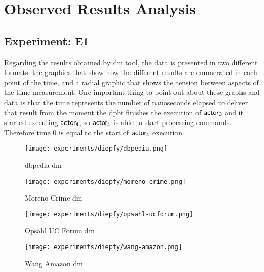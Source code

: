 \section{\textbf{Observed Results Analysis}}\label{sec:discussion}
\subsection{Experiment: E1}\label{sub:sec:res:e1}
Regarding the results obtained by \acrshort{dm} tool, the data is presented in two different formats: the graphics that show 
how the different results are enumerated in each point of the time, and a radial graphic that shows the tension between aspects of the time measurement.
One important thing to point out about these graphs and data is that the time represents the number of nanoseconds elapsed to deliver that result from the moment the \acrshort{dpbt} finishes the execution of $\mathsf{actor_3}$ and it started executing $\mathsf{actor_4}$, so $\mathsf{actor_4}$ is able to start processing commands. 
Therefore time $0$ is equal to the start of $\mathsf{actor_4}$ execution.

\begin{figure}[!htb]
  \centering
  \begin{minipage}{0.5\textwidth}
   \texttt{[image: experiments/diepfy/dbpedia.png]}
    \caption{\acrshort{dbpedia} \acrshort{dm}}
    \label{fig:dief:dbpedia}
  \end{minipage}%
  \begin{minipage}{0.5\textwidth}
   \texttt{[image: experiments/diepfy/moreno\_crime.png]}
    \caption{Moreno Crime \acrshort{dm}}
    \label{fig:dief:moreno}
  \end{minipage}
\end{figure}
%
\begin{figure}[!htb]
  \centering
  \begin{minipage}{0.5\textwidth}
   \texttt{[image: experiments/diepfy/opsahl-ucforum.png]}
    \caption{Opsahl UC Forum \acrshort{dm}}
    \label{fig:dief:opsahl}
  \end{minipage}%
  \begin{minipage}{0.5\textwidth}
    \texttt{[image: experiments/diepfy/wang-amazon.png]}
     \caption{Wang Amazon \acrshort{dm}}
     \label{fig:dief:wang}
   \end{minipage}
 \end{figure}

